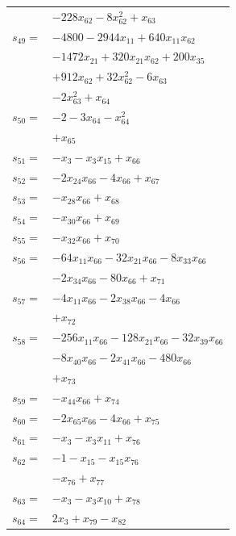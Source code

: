 \begin{longtable}{@{}r@{\;}l@{}}
 & \(\displaystyle -228x_{62} -8x_{62}^{2} +x_{63}\) \\[3pt]
\(s_{49}=\) & \(\displaystyle -4800 -2944x_{11} +640x_{11}x_{62}\) \\
 & \(\displaystyle -1472x_{21} +320x_{21}x_{62} +200x_{35}\) \\
 & \(\displaystyle +912x_{62} +32x_{62}^{2} -6x_{63}\) \\
 & \(\displaystyle -2x_{63}^{2} +x_{64}\) \\[3pt]
\(s_{50}=\) & \(\displaystyle -2 -3x_{64} -x_{64}^{2}\) \\
 & \(\displaystyle +x_{65}\) \\[3pt]
\(s_{51}=\) & \(\displaystyle -x_{3} -x_{3}x_{15} +x_{66}\) \\[3pt]
\(s_{52}=\) & \(\displaystyle -2x_{24}x_{66} -4x_{66} +x_{67}\) \\[3pt]
\(s_{53}=\) & \(\displaystyle -x_{28}x_{66} +x_{68}\) \\[3pt]
\(s_{54}=\) & \(\displaystyle -x_{30}x_{66} +x_{69}\) \\[3pt]
\(s_{55}=\) & \(\displaystyle -x_{32}x_{66} +x_{70}\) \\[3pt]
\(s_{56}=\) & \(\displaystyle -64x_{11}x_{66} -32x_{21}x_{66} -8x_{33}x_{66}\) \\
 & \(\displaystyle -2x_{34}x_{66} -80x_{66} +x_{71}\) \\[3pt]
\(s_{57}=\) & \(\displaystyle -4x_{11}x_{66} -2x_{38}x_{66} -4x_{66}\) \\
 & \(\displaystyle +x_{72}\) \\[3pt]
\(s_{58}=\) & \(\displaystyle -256x_{11}x_{66} -128x_{21}x_{66} -32x_{39}x_{66}\) \\
 & \(\displaystyle -8x_{40}x_{66} -2x_{41}x_{66} -480x_{66}\) \\
 & \(\displaystyle +x_{73}\) \\[3pt]
\(s_{59}=\) & \(\displaystyle -x_{44}x_{66} +x_{74}\) \\[3pt]
\(s_{60}=\) & \(\displaystyle -2x_{65}x_{66} -4x_{66} +x_{75}\) \\[3pt]
\(s_{61}=\) & \(\displaystyle -x_{3} -x_{3}x_{11} +x_{76}\) \\[3pt]
\(s_{62}=\) & \(\displaystyle -1 -x_{15} -x_{15}x_{76}\) \\
 & \(\displaystyle -x_{76} +x_{77}\) \\[3pt]
\(s_{63}=\) & \(\displaystyle -x_{3} -x_{3}x_{10} +x_{78}\) \\[3pt]
\(s_{64}=\) & \(\displaystyle 2x_{3} +x_{79} -x_{82}\) \\[3pt]

\end{longtable}
